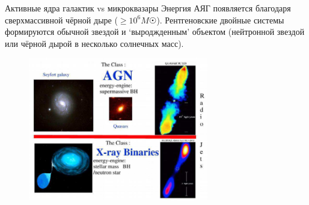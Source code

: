 \documentclass[8pt]{beamer}
\begin{document}
\begin{frame}{Активные ядра галактик vs микроквазары}
    Энергия АЯГ появляется благодаря сверхмассивной чёрной дыре ($\geq 10^6 M\astrosun$). Рентгеновские двойные системы формируются обычной звездой и `выроджденным' объектом (нейтронной звездой или чёрной дырой в несколько солнечных масс).
    \begin{figure}
        \centering
        \includegraphics[width=0.7\textwidth]{resources/agn-vs-xray-binaries.png}
    \end{figure}
\end{frame}
\end{document}
